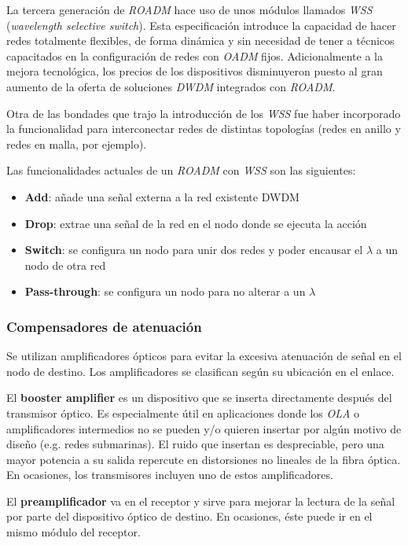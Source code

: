 La tercera generación de \emph{ROADM} hace uso de unos módulos
llamados \emph{WSS} (\emph{wavelength selective switch}). Esta
especificación introduce la capacidad de hacer redes totalmente
flexibles, de forma dinámica y sin necesidad de tener a técnicos
capacitados en la configuración de redes con \emph{OADM} fijos. 
Adicionalmente a la mejora tecnológica, los precios de los
dispositivos disminuyeron puesto al gran aumento de la oferta de
soluciones \emph{DWDM} integrados con \emph{ROADM}.

Otra de las bondades que trajo la introducción de los \emph{WSS} fue
haber incorporado la funcionalidad para interconectar redes de
distintas topologías (redes en anillo y redes en malla, por
ejemplo).

Las funcionalidades actuales de un \emph{ROADM} con \emph{WSS} son las
siguientes:
\begin{itemize}
\item \textbf{Add}: añade una señal externa a la red existente DWDM
\item \textbf{Drop}: extrae una señal de la red en el nodo donde se ejecuta la
  acción
\item \textbf{Switch}: se configura un nodo para unir dos redes y poder
  encausar el $\lambda$ a un nodo de otra red
\item \textbf{Pass-through}: se configura un nodo para no alterar a un
  $\lambda$
\end{itemize}

\subsubsection{Compensadores de atenuación}
\label{sec:amplificadores}

Se utilizan amplificadores ópticos para evitar la excesiva atenuación
de señal en el nodo de destino. Los amplificadores se clasifican según
su ubicación en el enlace\cite{G663}.

El \textbf{booster amplifier} es un dispositivo que se inserta 
directamente después del transmisor óptico. Es especialmente útil en
aplicaciones donde los \emph{OLA} o amplificadores intermedios no se
pueden y/o quieren insertar por algún motivo de diseño (e.g. redes 
submarinas). El ruido que insertan es despreciable, pero una mayor 
potencia a su salida repercute en distorsiones no lineales de la fibra
óptica. En ocasiones, los transmisores incluyen uno de estos
amplificadores.

El \textbf{preamplificador} va en el receptor y sirve para mejorar la
lectura de la señal por parte del dispositivo óptico de destino. En 
ocasiones, éste puede ir en el mismo módulo del receptor.


